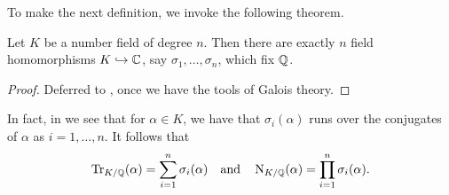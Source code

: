 To make the next definition, we invoke the following theorem.
\begin{theorem}
	Let $K$ be a number field of degree $n$.
	Then there are exactly $n$ field homomorphisms $K \hookrightarrow \mathbb C$,
	say $\sigma_1, \dots, \sigma_n$, which fix $\mathbb Q$.
\end{theorem}
\begin{proof}
	Deferred to , once we have the tools of Galois theory.
\end{proof}
In fact, in  we see that
for $\alpha \in K$, we have that $\sigma_i(\alpha)$
runs over the conjugates of $\alpha$ as $i=1,\dots,n$.
It follows that
\[
	\operatorname{Tr}_{K/\mathbb Q}(\alpha) = \sum_{i=1}^n \sigma_i(\alpha)
	\quad\text{and}\quad
	\operatorname{N}_{K/\mathbb Q}(\alpha) = \prod_{i=1}^n \sigma_i(\alpha).
\]

